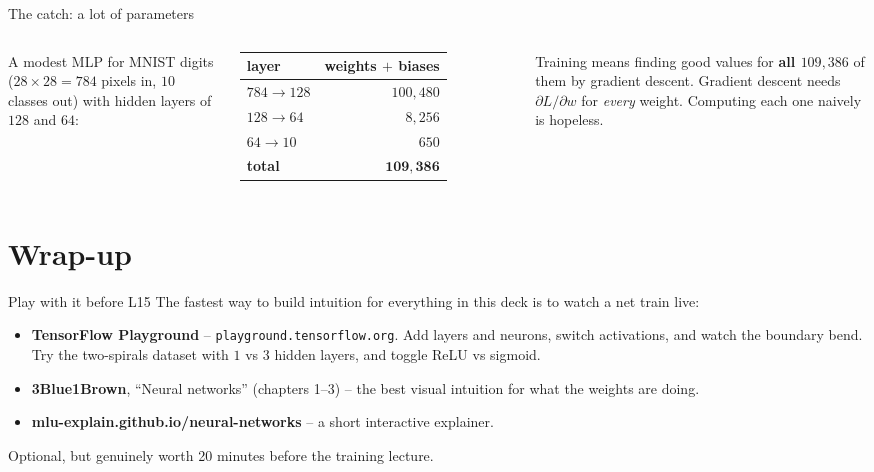 \documentclass[aspectratio=169]{beamer}
\begin{document}
\begin{frame}{The catch: a lot of parameters}
  \begin{columns}[T]
    A modest MLP for MNIST digits ($28\times28 = 784$ pixels in, $10$ classes out) with
    hidden layers of $128$ and $64$:
    \vskip 4pt
    \footnotesize
    \begin{tabular}{l r}
      layer & weights $+$ biases \\ \hline
      $784 \to 128$ & $100{,}480$ \\
      $128 \to 64$ & $8{,}256$ \\
      $64 \to 10$ & $650$ \\ \hline
      \textbf{total} & $\mathbf{109{,}386}$ \\
    \end{tabular}
    Training means finding good values for \textbf{all $109{,}386$} of them by gradient
    descent.
    \vskip 6pt
    Gradient descent needs $\partial L / \partial w$ for \emph{every} weight. Computing each
    one naively is hopeless.
    \vskip 6pt
  \end{columns}
\end{frame}

\section{Wrap-up}

\begin{frame}{Play with it before L15}
  The fastest way to build intuition for everything in this deck is to watch a net train live:
  \vfill
  \begin{itemize}\small
    \item \textbf{TensorFlow Playground} -- \texttt{playground.tensorflow.org}. Add layers and
      neurons, switch activations, and watch the boundary bend. Try the two-spirals dataset
      with $1$ vs $3$ hidden layers, and toggle ReLU vs sigmoid.
    \item \textbf{3Blue1Brown}, ``Neural networks'' (chapters 1--3) -- the best visual
      intuition for what the weights are doing.
    \item \textbf{mlu-explain.github.io/neural-networks} -- a short interactive explainer.
  \end{itemize}
  \vfill
  \footnotesize Optional, but genuinely worth 20 minutes before the training lecture.
\end{frame}
\end{document}
